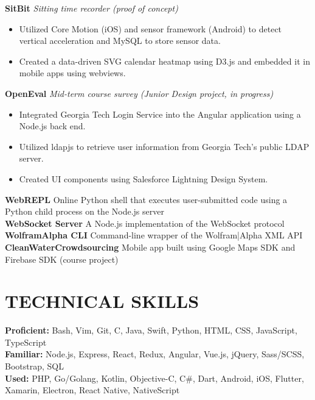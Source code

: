 \documentclass[11pt]{article}
\begin{document}
%
\textbf{SitBit} \enspace \textit{\color{gray} Sitting time recorder (proof of concept)} 
\begin{itemize}[leftmargin=15pt, noitemsep, topsep=0pt]
\item Utilized Core Motion (iOS) and sensor framework (Android) to detect vertical acceleration and MySQL to store sensor data.
\item Created a data-driven SVG calendar heatmap using D3.js and embedded it in mobile apps using webviews.
\end{itemize}
\vspace{0.5em}
%
\textbf{OpenEval} \enspace \textit{\color{gray} Mid-term course survey (Junior Design project, in progress)}
\begin{itemize}[leftmargin=15pt, noitemsep, topsep=0pt]
\item Integrated Georgia Tech Login Service  into the Angular application using a Node.js back end.
\item Utilized ldapjs to retrieve user information from Georgia Tech's public LDAP server.
\item Created UI components using Salesforce Lightning Design System.
\end{itemize}
\vspace{0.5em}
%
\textbf{WebREPL}  \enspace Online Python shell that executes user-submitted code using a Python child process on the Node.js server\\
\textbf{WebSocket Server}  \enspace A Node.js implementation of the WebSocket protocol\\
\textbf{WolframAlpha CLI} \enspace Command-line wrapper of the Wolfram|Alpha XML API\\
\textbf{CleanWaterCrowdsourcing} \enspace Mobile app built using Google Maps SDK and Firebase SDK (course project)

\section*{TECHNICAL SKILLS}
\textbf{Proficient:} Bash, Vim, Git, C, Java, Swift, Python, HTML, CSS, JavaScript, TypeScript\\
\textbf{Familiar:} Node.js, Express, React, Redux, Angular, Vue.js, jQuery, Sass/SCSS, Bootstrap, SQL\\
\textbf{Used:} PHP, Go/Golang, Kotlin, Objective-C, C\#, Dart, Android, iOS, Flutter, Xamarin, Electron, React Native, NativeScript
\end{document}
